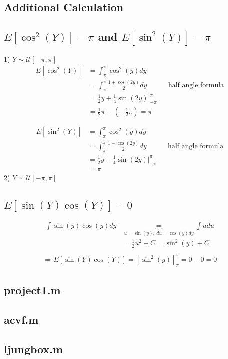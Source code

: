 \documentclass{article}
\begin{document}
\begin{appendices}

\section{Additional Calculation}

\subsection{$E[\cos^2(Y)] = \pi$ and $E[\sin^2(Y)] = \pi$}
\label{appendix:cos2y}

1) $ Y \sim \mathcal{U}[-\pi, \pi] $\\
\begin{align*}
E[\cos^2(Y)] &= \int_{\pi}^\pi \cos^2(y) dy\\
&= \int_{\pi}^\pi \frac{1 + \cos(2y)}{2} dy &&\text{half angle formula}\\
&= \frac{1}{2} y + \frac{1}{4} \sin(2y) \Big|_{-\pi}^\pi\\
&= \frac{1}{2} \pi - (- \frac{1}{2} \pi) = \pi
\end{align*}

\begin{align*}
E[\sin^2(Y)] &= \int_{\pi}^\pi \cos^2(y) dy\\
&= \int_{\pi}^\pi \frac{1 - \cos(2y)}{2} dy &&\text{half angle formula}\\
&= \frac{1}{2} y - \frac{1}{4} \sin(2y) \Big|_{-\pi}^\pi\\
&= \pi
\end{align*}
2) $ Y \sim \mathcal{U}[-\pi, \pi] $

\subsection{$E[\sin(Y)\cos(Y)] = 0$} \label{appendix:sinycosy}
\begin{align*}
\int \sin(y)\cos(y)dy& \underbrace{=}_{u = \sin(y), \ du = \cos(y)dy} \int u du \\
&= \frac 1 2 u^2 + C = \sin^2(y) + C \\
\end{align*}
\begin{align*}
\Rightarrow E[\sin(Y)\cos(Y)] = [\sin^2(y)]^{\pi}_{\pi} = 0 - 0 = 0
\end{align*}

\subsection{project1.m}


\subsection{acvf.m}


\subsection{ljungbox.m}


\end{appendices}



\end{document}
